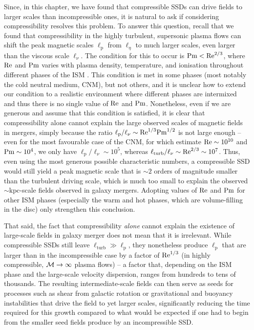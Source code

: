 Since, in this chapter, we have found that compressible SSDs can drive fields to larger scales than incompressible ones, it is natural to ask if considering compressibility resolves this problem. To answer this question, recall that we found that compressibility in the highly turbulent, supersonic plasma flows can shift the peak magnetic scales $\ell_\mathrm{p}$ from $\ell_\eta$ to much larger scales, even larger than the viscous scale $\ell_\nu$. The condition for this to occur is $\mathrm{Pm} < \mathrm{Re}^{2/3}$, where $\mathrm{Re}$ and $\mathrm{Pm}$ varies with plasma density, temperature, and ionisation throughout different phases of the ISM \citep{rincon2019dynamo, ferriere2019plasma, shukurov2021astrophysical, brandenburg2023galactic}. This condition is met in some phases (most notably the cold neutral medium, CNM), but not others, and it is unclear how to extend our condition to a realistic environment where different phases are intermixed and thus there is no single value of $\mathrm{Re}$ and $\mathrm{Pm}$. Nonetheless, even if we are generous and assume that this condition is satisfied, it is clear that compressibility alone cannot explain the large observed scales of magnetic fields in mergers, simply because the ratio $\ell_\mathrm{p}/\ell_\nu \sim \mathrm{Re}^{1/3}\mathrm{Pm}^{1/2}$ is not large enough -- even for the most favourable case of the CNM, for which \citet{brandenburg2023galactic} estimate $\mathrm{Re}\sim 10^{10}$ and $\mathrm{Pm} \sim 10^{4}$, we only have $\ell_\mathrm{p}/\ell_\nu \sim 10^5$, whereas $\ell_\mathrm{turb}/\ell_\nu \sim \mathrm{Re}^{2/3} \sim 10^{7}$. Thus, even using the most generous possible characteristic numbers, a compressible SSD would still yield a peak magnetic scale that is $\sim 2$ orders of magnitude smaller than the turbulent driving scale, which is much too small to explain the observed $\sim\mathrm{kpc}$-scale fields observed in galaxy mergers. Adopting values of $\mathrm{Re}$ and $\mathrm{Pm}$ for other ISM phases (especially the warm and hot phases, which are volume-filling in the disc) only strengthen this conclusion.

That said, the fact that compressibility \textit{alone} cannot explain the existence of large-scale fields in galaxy merger does not mean that it is irrelevant. While compressible SSDs still leave $\ell_\mathrm{turb} \gg \ell_\mathrm{p}$, they nonetheless produce $\ell_\mathrm{p}$ that are larger than in the incompressible case by a factor of $\mathrm{Re}^{1/3}$ (in highly compressible, $\mathcal{M}\to\infty$ plasma flows) -- a factor that, depending on the ISM phase and the large-scale velocity dispersion, ranges from hundreds to tens of thousands. The resulting intermediate-scale fields can then serve as seeds for processes such as shear from galactic rotation or gravitational and buoyancy instabilities \citep[e.g.][]{pakmor2017magnetic, steinwandel2023towards} that drive the field to yet larger scales, significantly reducing the time required for this growth compared to what would be expected if one had to begin from the smaller seed fields produce by an incompressible SSD.

